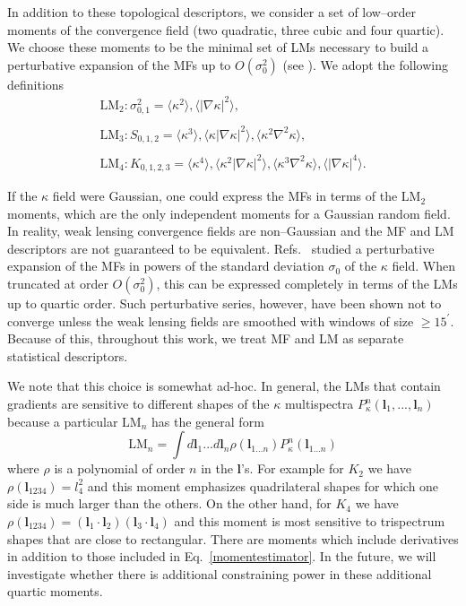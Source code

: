 \documentclass[reprint,aps,prd,superscriptaddress,showkeys,showpacs]{revtex4-1}
\begin{document}
In addition to these topological descriptors, we consider a set of
low--order moments of the convergence field (two quadratic, three
cubic and four quartic). We choose these moments to be the minimal set
of LMs necessary to build a perturbative expansion of the MFs up to
$O(\sigma_0^2)$ (see \citep{Munshi12,Matsubara10}). We adopt the
following definitions
%
\begin{equation}
\label{momentestimator}
\begin{matrix}
\mathrm{LM_2}: \sigma_{0,1}^2 = \langle\kappa^2\rangle,\langle\vert\nabla\kappa\vert^2\rangle, \\ \\
\mathrm{LM_3}: S_{0,1,2} = \langle\kappa^3\rangle,\langle\kappa\vert\nabla\kappa\vert^2\rangle,\langle\kappa^2\nabla^2\kappa\rangle, \\ \\
\mathrm{LM_4}: K_{0,1,2,3} = \langle\kappa^4\rangle,\langle\kappa^2\vert\nabla\kappa\vert^2\rangle,\langle\kappa^3\nabla^2\kappa\rangle,\langle\vert\nabla\kappa\vert^4\rangle.
\end{matrix}
\end{equation}
%

If the $\kappa$ field were Gaussian, one could express the MFs in
terms of the LM$_2$ moments, which are the only independent moments
for a Gaussian random field. In reality, weak lensing convergence
fields are non--Gaussian and the MF and LM descriptors are not
guaranteed to be equivalent. Refs.~\citep{Munshi12,Matsubara10}
studied a perturbative expansion of the MFs in powers of the standard
deviation $\sigma_0$ of the $\kappa$ field. When truncated at order
$O(\sigma_0^2)$, this can be expressed completely in terms of the LMs
up to quartic order. Such perturbative series, however, have been
shown not to converge \citep{Petri2013} unless the weak lensing fields
are smoothed with windows of size $\geq 15^\prime$. Because of this,
throughout this work, we treat MF and LM as separate statistical
descriptors.

We note that this choice is somewhat ad-hoc. In general, the LMs that
contain gradients are sensitive to different shapes of the $\kappa$
multispectra $P_{\kappa}^n(\mathbf{l}_1,...,\mathbf{l}_n)$ because a
particular $\mathrm{LM}_n$ has the general form
%
\begin{equation}
\mathrm{LM}_n = \int d\mathbf{l}_1...d\mathbf{l}_n \rho(\mathbf{l}_{1...n})P^n_{\kappa}(\mathbf{l}_{1...n})
\end{equation}
%
where $\rho$ is a polynomial of order $n$ in the $\mathbf{l}$'s. For
example for $K_2$ we have $\rho(\mathbf{l}_{1234})=l_4^2$ and this
moment emphasizes quadrilateral shapes for which one side is much
larger than the others. On the other hand, for $K_4$ we have
$\rho(\mathbf{l}_{1234})=(\mathbf{l}_1\cdot\mathbf{l}_2)(\mathbf{l}_3\cdot\mathbf{l}_4)$
and this moment is most sensitive to trispectrum shapes that are close
to rectangular. There are moments which include derivatives in
addition to those included in Eq.~\ref{momentestimator}. In the
future, we will investigate whether there is additional constraining
power in these additional quartic moments.
\end{document}

